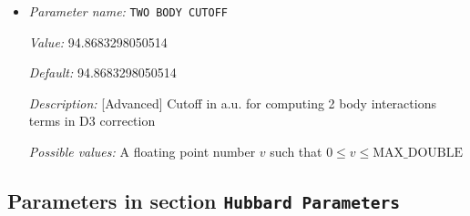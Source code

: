 \begin{itemize}
{\it Value:} 40.0


{\it Default:} 40.0


{\it Description:} [Advanced] Cutoff in a.u. for computing 3 body interactions terms in D3 correction


{\it Possible values:} A floating point number $v$ such that $0 \leq v \leq \text{MAX\_DOUBLE}$
\item {\it Parameter name:} {\tt TWO BODY CUTOFF}
\label{parameters:DFT functional parameters/Dispersion Correction/TWO BODY CUTOFF}
\label{parameters:DFT_20functional_20parameters/Dispersion_20Correction/TWO_20BODY_20CUTOFF}


{\it Value:} 94.8683298050514


{\it Default:} 94.8683298050514


{\it Description:} [Advanced] Cutoff in a.u. for computing 2 body interactions terms in D3 correction


{\it Possible values:} A floating point number $v$ such that $0 \leq v \leq \text{MAX\_DOUBLE}$
\end{itemize}


\subsection{Parameters in section \tt Hubbard Parameters}
\label{parameters:Hubbard}

